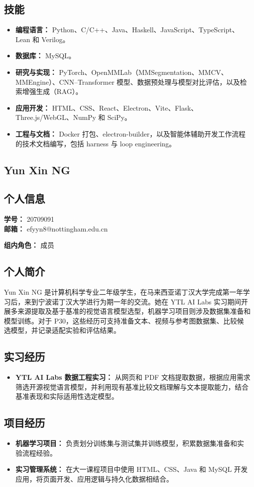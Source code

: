 \documentclass[a4paper,12pt]{article}
\newcommand{\PersonalInformation}[2]{%
  \subsection*{个人信息}
  \if\relax\detokenize{#1}\relax\else
  \noindent\textbf{学号：} #1\\
  \fi
  \textbf{邮箱：} #2\par
}
\begin{document}
\subsection*{技能}
\begin{itemize}
  \item \textbf{编程语言：} Python、C/C++、Java、Haskell、JavaScript、TypeScript、Lean 和 Verilog。
  \item \textbf{数据库：} MySQL。
  \item \textbf{研究与实现：} PyTorch、OpenMMLab（MMSegmentation、MMCV、MMEngine）、CNN--Transformer 模型、数据预处理与模型对比评估，以及检索增强生成（RAG）。
  \item \textbf{应用开发：} HTML、CSS、React、Electron、Vite、Flask、Three.js/WebGL、NumPy 和 SciPy。
  \item \textbf{工程与文档：} Docker 打包、electron-builder，以及智能体辅助开发工作流程的技术文档编写，包括 harness 与 loop engineering。
\end{itemize}

\subsection{Yun Xin NG}
\PersonalInformation{20709091}{efyyn8@nottingham.edu.cn}
\noindent\textbf{组内角色：} 成员\par

\subsection*{个人简介}
Yun Xin NG 是计算机科学专业二年级学生，在马来西亚诺丁汉大学完成第一年学习后，来到宁波诺丁汉大学进行为期一年的交流。她在 YTL AI Labs 实习期间开展多来源提取及基于基准的视觉语言模型选型，机器学习项目则涉及数据集准备和模型训练。对于 P30，这些经历可支持准备文本、视频与参考图数据集、比较候选模型，并记录适配实验和评估结果。

\subsection*{实习经历}
\begin{itemize}
  \item \textbf{YTL AI Labs 数据工程实习：} 从网页和 PDF 文档提取数据，根据应用需求筛选开源视觉语言模型，并利用现有基准比较文档理解与文本提取能力，结合基准表现和实际适用性选定模型。
\end{itemize}

\subsection*{项目经历}
\begin{itemize}
  \item \textbf{机器学习项目：} 负责划分训练集与测试集并训练模型，积累数据集准备和实验流程经验。
  \item \textbf{实习管理系统：} 在大一课程项目中使用 HTML、CSS、Java 和 MySQL 开发应用，将页面开发、应用逻辑与持久化数据相结合。
\end{itemize}
\end{document}
